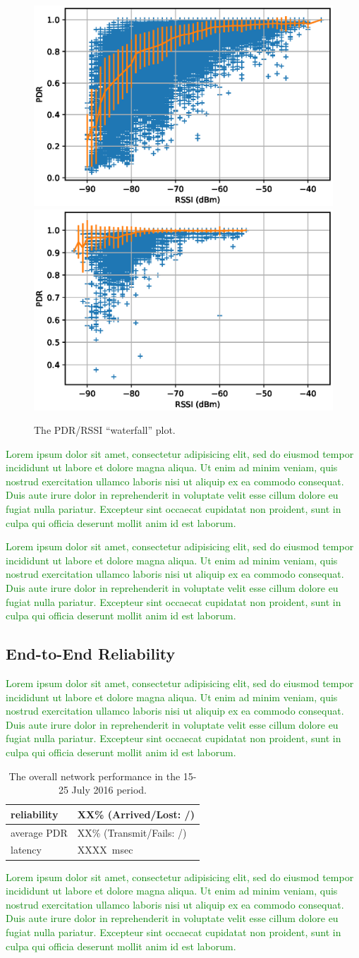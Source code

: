 \documentclass{elsarticle}
\newcommand{\lorem}          {\textcolor{green}{Lorem ipsum dolor sit amet, consectetur adipisicing elit, sed do eiusmod tempor incididunt ut labore et dolore magna aliqua. Ut enim ad minim veniam, quis nostrud exercitation ullamco laboris nisi ut aliquip ex ea commodo consequat. Duis aute irure dolor in reprehenderit in voluptate velit esse cillum dolore eu fugiat nulla pariatur. Excepteur sint occaecat cupidatat non proident, sunt in culpa qui officia deserunt mollit anim id est laborum.}}
\begin{document}
\begin{figure}
    \includegraphics[width=0.5\columnwidth]{waterfall.eps}
    \includegraphics[width=0.5\columnwidth]{waterfall_peach.eps}  
    \caption{
        The PDR/RSSI ``waterfall'' plot.
    }
    \label{fig:waterfall}
\end{figure}

\lorem


\lorem

\subsection{End-to-End Reliability}
\label{sec:net_reliability}


\lorem

\begin{table}
    \begin{tabular}{|l|l|}
        \hline
        reliability & XX\% (Arrived/Lost:   /)\\ \hline
        average PDR & XX\% (Transmit/Fails: /)\\ \hline
        latency     & XXXX~msec\\
        \hline
    \end{tabular}
    \caption{The overall network performance in the 15-25 July 2016 period.}
    \label{tab:net_stats}
\end{table}

\lorem
\end{document}
